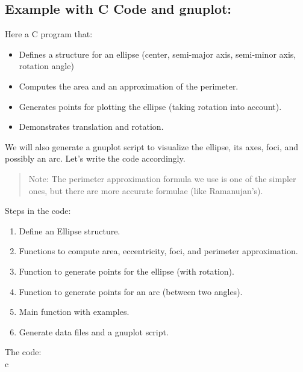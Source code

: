 \documentclass[a4paper,14pt]{article}
\begin{document}
\subsection{Example with C Code and gnuplot:}
Here a C program that:\\
\begin{itemize}
\item Defines a structure for an ellipse (center, semi-major axis, semi-minor axis, rotation angle)
\item Computes the area and an approximation of the perimeter.
\item Generates points for plotting the ellipse (taking rotation into account).
\item Demonstrates translation and rotation.
\end{itemize}
 We will also generate a gnuplot script to visualize the ellipse, its axes, foci, and possibly an arc.
 Let's write the code accordingly.
\begin{quote}
 Note: The perimeter approximation formula we use is one of the simpler ones, but there are more accurate formulae (like Ramanujan's).
\end{quote}
Steps in the code:\\
\begin{enumerate}
\item Define an Ellipse structure.
\item Functions to compute area, eccentricity, foci, and perimeter approximation.
\item Function to generate points for the ellipse (with rotation).
\item Function to generate points for an arc (between two angles).
\item Main function with examples.
\item Generate data files and a gnuplot script.
\end{enumerate}
The code:\\
c\\
\end{document}

